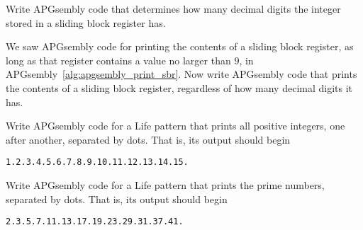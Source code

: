 \begin{multicols}{2}
	
	\mfilbreak
	
	
	\begin{problem}\label{exer:universal_computation_determine_digits}
		Write APGsembly code that determines how many decimal digits the integer stored in a sliding block register has.
	\end{problem}
	
	
	\mfilbreak
	
	
	\begin{problem}\label{exer:universal_computation_print_register}
		We saw APGsembly code for printing the contents of a sliding block register, as long as that register contains a value no larger than $9$, in APGsembly~\ref{alg:apgsembly_print_sbr}. Now write APGsembly code that prints the contents of a sliding block register, regardless of how many decimal digits it has.
		
	\end{problem}
	
	
	\mfilbreak
	
	
	\begin{problem}\label{exer:universal_computation_print_integers}
		Write APGsembly code for a Life pattern that prints all positive integers, one after another, separated by dots. That is, its output should begin
		\begin{center}
			\texttt{1.2.3.4.5.6.7.8.9.10.11.12.13.14.15.}
		\end{center}
		
	\end{problem}
	
	
	\mfilbreak
	
	
	\begin{problem}\label{exer:universal_computation_print_prime}
		Write APGsembly code for a Life pattern that prints the prime numbers, separated by dots. That is, its output should begin
		\begin{center}
			\texttt{2.3.5.7.11.13.17.19.23.29.31.37.41.}
		\end{center}
		
	\end{problem}
	

\end{multicols}
